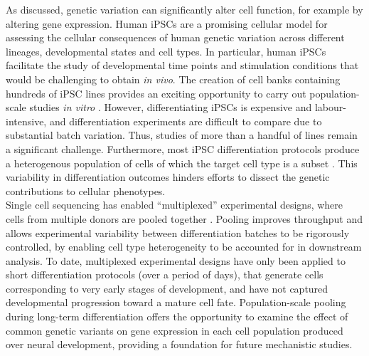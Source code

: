 As discussed, genetic variation can significantly alter cell function, for example by altering gene expression. 
Human iPSCs are a promising cellular model for assessing the cellular consequences of human genetic variation across different lineages, developmental states and cell types. 
In particular, human iPSCs facilitate the study of developmental time points and stimulation conditions that would be challenging to obtain \textit{in vivo}. 
The creation of cell banks containing hundreds of iPSC lines \cite{kilpinen2017common} provides an exciting opportunity to carry out population-scale studies \textit{in vitro} \cite{cuomo2020single, strober2019dynamic, schwartzentruber2018molecular, alasoo2018shared}.
However, differentiating iPSCs is expensive and labour-intensive, and differentiation experiments are difficult to compare due to substantial batch variation. 
Thus, studies of more than a handful of lines remain a significant challenge.
Furthermore, most iPSC differentiation protocols produce a heterogenous population of cells of which the target cell type is a subset \cite{d2019vitro, banovich2018impact, volpato2018reproducibility, nguyen2018single}. 
This variability in differentiation outcomes hinders efforts to dissect the genetic contributions to cellular phenotypes.\\

Single cell sequencing has enabled “multiplexed” experimental designs, where cells from multiple donors are pooled together \cite{cuomo2020single, nguyen2018single}. 
Pooling improves throughput and allows experimental variability between differentiation batches to be rigorously controlled, by enabling cell type heterogeneity to be accounted for in downstream analysis. 
To date, multiplexed experimental designs have only been applied to short differentiation protocols (over a period of days), that generate cells corresponding to very early stages of development, and have not captured developmental progression toward a mature cell fate. 
Population-scale pooling during long-term differentiation offers the opportunity to examine the effect of common genetic variants on gene expression in each cell population produced over neural development, providing a foundation for future mechanistic studies.\\

